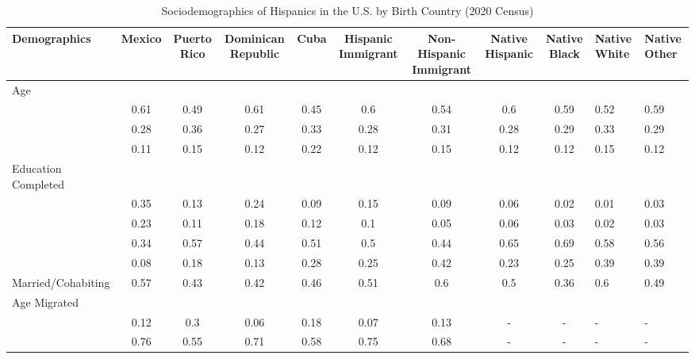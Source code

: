 \begin{table}[ht]
\centering
\caption{Sociodemographics of Hispanics in the U.S. by Birth Country (2020 Census)} 
\begingroup\small
\begin{tabular}{>{\raggedright\arraybackslash}p{3.2cm}|cccccccc}
  \hline
Demographics & Mexico & Puerto Rico & Dominican Republic & Cuba & Hispanic Immigrant & Non-Hispanic Immigrant & Native Hispanic  & Native Black & Native White & Native Other \\ 
  \hline
Age &  &  &  &  &  &  &  &  &  &  \\ 
  & 0.61 & 0.49 & 0.61 & 0.45 & 0.6 & 0.54 & 0.6 & 0.59 & 0.52 & 0.59 \\ 
  & 0.28 & 0.36 & 0.27 & 0.33 & 0.28 & 0.31 & 0.28 & 0.29 & 0.33 & 0.29 \\ 
  & 0.11 & 0.15 & 0.12 & 0.22 & 0.12 & 0.15 & 0.12 & 0.12 & 0.15 & 0.12 \\ 
  Education Completed &  &  &  &  &  &  &  &  &  &  \\ 
  & 0.35 & 0.13 & 0.24 & 0.09 & 0.15 & 0.09 & 0.06 & 0.02 & 0.01 & 0.03 \\ 
  & 0.23 & 0.11 & 0.18 & 0.12 & 0.1 & 0.05 & 0.06 & 0.03 & 0.02 & 0.03 \\ 
  & 0.34 & 0.57 & 0.44 & 0.51 & 0.5 & 0.44 & 0.65 & 0.69 & 0.58 & 0.56 \\ 
  & 0.08 & 0.18 & 0.13 & 0.28 & 0.25 & 0.42 & 0.23 & 0.25 & 0.39 & 0.39 \\ 
  Married/Cohabiting & 0.57 & 0.43 & 0.42 & 0.46 & 0.51 & 0.6 & 0.5 & 0.36 & 0.6 & 0.49 \\ 
  Age Migrated &  &  &  &  &  &  &  &  &  &  \\ 
  & 0.12 & 0.3 & 0.06 & 0.18 & 0.07 & 0.13 & - & - & - & - \\ 
  & 0.76 & 0.55 & 0.71 & 0.58 & 0.75 & 0.68 & - & - & - & - \\ 

\end{tabular}
\end{table}
